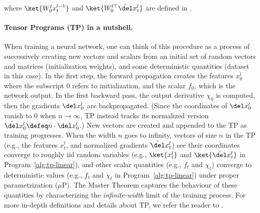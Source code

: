 \begin{algorithm}[ht]
\caption{Random Variables induced from Tensor Program for the Linear Network with LR $\eta =1$ and frozen $U, V$. }\label{alg:tp-linear}
where $\ket{W_0^l x_t^{l-1}}$ and $\ket{W_0^{l\top} \tilde\del x_t^l}$ are defined in .
\end{algorithm}

\paragraph{Tensor Programs (TP) in a nutshell.} When training a neural network, one can think of this procedure as a process of successively creating new vectors and scalars from an initial set of random vectors and matrices (initialization weights), and some deterministic quantities (dataset in this case). In the first step, the forward propagation creates the features $x^l_0$ where the subscript $0$ refers to initialization, and the scalar $f_0$, which is the network output. In the first backward pass, the output derivative $\chi_0$ is computed, then the gradients $\del x^l_0$ are backpropagated. (Since the coordinates of  $\del x_0^l$ vanish to 0 when $n\to \infty$, TP instead tracks its normalized version $\tilde\del x_0^l\defeq n\cdot \del x_0^l$.) New vectors are created and appended to the TP as training progresses. When the width $n$ goes to infinity, vectors of size $n$ in the TP (e.g., the features $x^l_t$, and normalized gradients $\tilde\del x^l_t$) see their coordinates converge to roughly iid random variables (e.g., $\ket{x^l_t}$ and $\ket{\tilde\del x^l_t}$ in Program~\ref{alg:tp-linear}), and other scalar quantities (e.g., $f_t$ and $\chi_t$) converge to deterministic values (e.g., $\mathring f_t$ and $\mathring \chi_t$ in Program~\ref{alg:tp-linear}) under proper parametrization ($\mu$P). The Master Theorem \citep{yang2022tensor} captures the behaviour of these quantities by characterizing the \emph{infinite-width} limit of the training process. For more in-depth definitions and details about TP, we refer the reader to \cite{yang2022tensor}.

